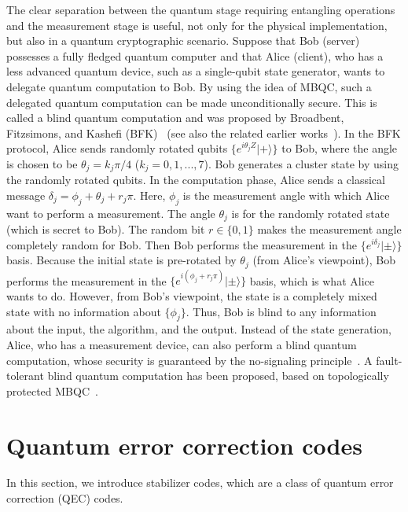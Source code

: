 The clear separation between the quantum stage requiring entangling operations and the measurement stage is useful, not only for the physical implementation, but also in a quantum cryptographic scenario.
Suppose that Bob (server) possesses a fully fledged quantum computer and
that Alice (client), who has a less advanced quantum device, such as a single-qubit state generator, wants to delegate quantum computation to Bob.
By using the idea of MBQC, such a delegated quantum computation can be made unconditionally secure.
This is called a blind quantum computation and was proposed by Broadbent, Fitzsimons, and Kashefi (BFK)~\cite{Blind} (see also the related earlier works~\cite{ChildsBlind,ArrighiBlind}).
In the BFK protocol, Alice sends randomly rotated qubits $\{ e^{i \theta _j Z } |+\rangle\}$ to Bob, where the angle is chosen to be $\theta _j = k_j \pi /4$ ($k_j=0,1,...,7$).
Bob generates a cluster state by using the randomly rotated qubits.
In the computation phase, Alice sends a classical message $\delta _j = \phi _j + \theta _j + r_j \pi $.
Here, $\phi _j$ is the measurement angle with which Alice want to perform a measurement. The angle $\theta _j$ is for the randomly rotated state (which is secret to Bob). The random bit $r\in \{0,1\}$ makes the measurement angle completely random for Bob.
Then Bob performs the measurement in the $\{ e^{i\delta_j} |\pm \rangle\}$ basis.
Because the initial state is pre-rotated by $\theta_j$ (from Alice's viewpoint), Bob performs the measurement in the $\{ e^{i(\phi _j + r_j \pi) } |\pm \rangle\}$ basis, which is what Alice wants to do.
However, from Bob's viewpoint, the state is a completely mixed state with no information about $\{\phi _j\}$.
Thus, Bob is blind to any information about the input, the algorithm, and the output.
Instead of the state generation, Alice, who has a measurement device, can also perform a blind quantum computation, whose security is guaranteed by the no-signaling principle~\cite{MoriBlind}.
A fault-tolerant blind quantum computation has been proposed, based on topologically protected MBQC~\cite{BlindMoriFuji}.

\section{Quantum error correction codes}
In this section, we introduce stabilizer codes, which are a class of quantum error correction (QEC) codes.

